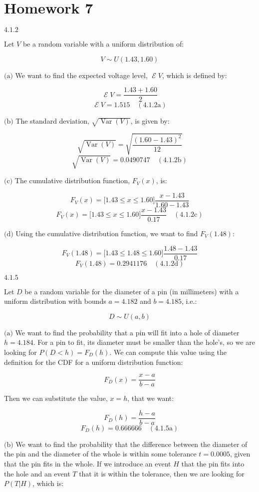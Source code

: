 \documentclass{article}
\newcommand{\problem}[2]{$\boxed{\text{#1.#2}}$}
\newcommand{\subproblem}[3]{$\boxed{\text{(#3)}}$}
\newcommand{\subsolution}[4]{\boxed{#4\quad(\text{#1.#2#3})}}
\DeclareMathOperator{\var}{Var}
\DeclareMathOperator{\E}{\mathcal{E}}
\begin{document}
\section*{Homework 7}

%
\problem{4.1}{2}

Let $V$ be a random variable with a uniform distribution of:

\[
V\sim U(1.43, 1.60)
\]

%
\subproblem{4.1}{2}{a} We want to find the expected voltage level,
$\E{}V$, which is defined by:

\[
\E V=\frac{1.43+1.60}{2}
\] \[
\subsolution{4.1}{2}{a}{\E V=1.515}
\]

%
\subproblem{4.1}{2}{b} The standard deviation, $\sqrt{\var(V)}$, is
given by:

\[
\sqrt{\var(V)}=\sqrt{\frac{(1.60-1.43)^2}{12}}
\] \[
\subsolution{4.1}{2}{b}{\sqrt{\var(V)}=0.0490747}
\]

%
\subproblem{4.1}{2}{c} The cumulative distribution function, $F_V(x)$,
is:

\[
F_V(x)=\lbrack1.43\le x\le1.60\rbrack\frac{x-1.43}{1.60-1.43}
\] \[
\subsolution{4.1}{2}{c}{F_V(x)=\lbrack1.43\le x\le1.60\rbrack\frac{x-1.43}{0.17}}
\]

%
\subproblem{4.1}{2}{d} Using the cumulative distribution function, we
want to find $F_V(1.48)$:

\[
F_V(1.48)=\lbrack1.43\le 1.48\le1.60\rbrack\frac{1.48-1.43}{0.17}
\] \[
\subsolution{4.1}{2}{d}{F_V(1.48)=0.2941176}
\]

%
\problem{4.1}{5}

Let $D$ be a random variable for the diameter of a pin (in
millimeters) with a uniform distribution with bounds $a=4.182$ and
$b=4.185$, i.e.:

\[
D\sim U(a,b)
\]

%
\subproblem{4.1}{5}{a} We want to find the probability that a pin will
fit into a hole of diameter $h=4.184$. For a pin to fit, its diameter
must be smaller than the hole's, so we are looking for
$P(D<h)=F_D(h)$. We can compute this value using the definition for
the CDF for a uniform distribution function:

\[
F_D(x)=\frac{x-a}{b-a}
\]

Then we can substitute the value, $x=h$, that we want:

\[
F_D(h)=\frac{h-a}{b-a}
\] \[
\subsolution{4.1}{5}{a}{F_D(h)=0.666666}
\]

%
\subproblem{4.1}{5}{b} We want to find the probability that the
difference between the diameter of the pin and the diameter of the
whole is within some tolerance $t=0.0005$, given that the pin fits in
the whole. If we introduce an event $H$ that the pin fits into the
hole and an event $T$ that it is within the tolerance, then we are
looking for $P(T|H)$, which is:
\end{document}
